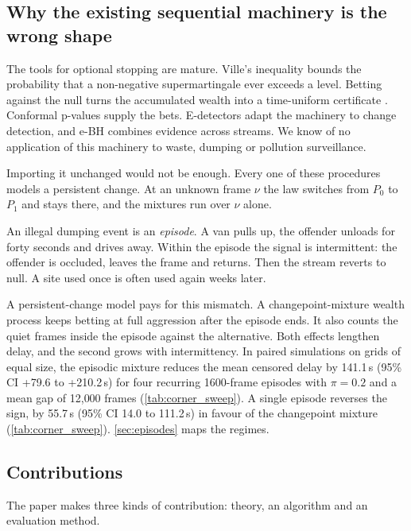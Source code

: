 \subsection{Why the existing sequential machinery is the wrong shape}

The tools for optional stopping are mature. Ville's inequality \citep{ville1939}
bounds the probability that a non-negative supermartingale ever exceeds a level.
Betting against the null turns the accumulated wealth into a time-uniform
certificate \citep{shafer2019game,ramdas2023savi}. Conformal p-values
\citep{vovk2005alrw} supply the bets. E-detectors \citep{shin2024edetectors} adapt
the machinery to change detection, and e-BH \citep{wang2022ebh} combines evidence
across streams. We know of no application of this machinery to waste, dumping or
pollution surveillance.

Importing it unchanged would not be enough. Every one of these procedures models a
persistent change. At an unknown frame $\nu$ the law switches from $P_0$ to $P_1$
and stays there, and the mixtures run over $\nu$ alone.

An illegal dumping event is an \emph{episode}. A van pulls up, the offender unloads
for forty seconds and drives away. Within the episode the signal is intermittent:
the offender is occluded, leaves the frame and returns. Then the stream reverts to
null. A site used once is often used again weeks later.

A persistent-change model pays for this mismatch. A changepoint-mixture wealth
process keeps betting at full aggression after the episode ends. It also counts the
quiet frames inside the episode against the alternative. Both effects lengthen
delay, and the second grows with intermittency. In paired simulations on grids of equal
size, the episodic mixture reduces the mean censored delay by 141.1\,s (95\% CI +79.6
to +210.2\,s) for four recurring 1600-frame episodes with $\pi=0.2$ and a mean gap of
12{,}000 frames (\cref{tab:corner_sweep}). A single episode reverses the sign, by 55.7\,s (95\% CI 14.0 to
111.2\,s) in favour of the changepoint mixture (\cref{tab:corner_sweep}). \cref{sec:episodes} maps the regimes.

\subsection{Contributions}

The paper makes three kinds of contribution: theory, an algorithm and an
evaluation method.

